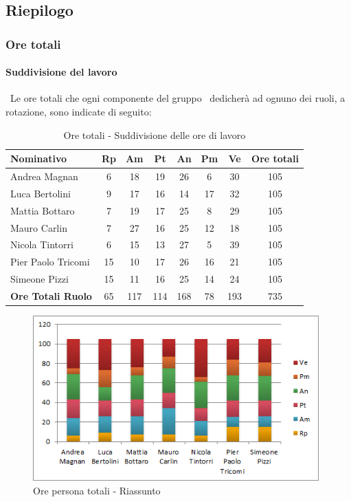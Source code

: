 \documentclass[../PianoDiProgetto.tex]{subfiles}
\begin{document}
\vspace{35mm}	
	
	\subsection{Riepilogo}
			\subsubsection{Ore totali}
				\paragraph{Suddivisione del lavoro}\
					Le ore totali che ogni componente del gruppo \GRUPPO\ dedicherà ad ognuno dei ruoli, a rotazione, sono indicate di seguito:
	
	\begin{table}[H]
		\begin{tabularx}{\textwidth}{l  * {6}{c}  c}
			\toprule
			\textbf{Nominativo} & \textbf{Rp} & \textbf{Am} & \textbf{Pt} 
						& \textbf{An} & \textbf{Pm} & \textbf{Ve} & \textbf{Ore totali} \\
			\midrule
			Andrea Magnan  & 6  & 18 & 19 & 26 & 6  & 30 & 105 \\
			Luca Bertolini  & 9 & 17 & 16 & 14 & 17 & 32 & 105 \\
			Mattia Bottaro  & 7  & 19 & 17 & 25 & 8  & 29 & 105 \\
			Mauro Carlin  & 7 & 27 & 16 & 25 & 12 & 18 & 105 \\
			Nicola Tintorri  & 6 & 15 & 13 & 27 & 5 & 39 & 105 \\
			Pier Paolo Tricomi  & 15 & 10 & 17 & 26 & 16 & 21 & 105 \\
			Simeone Pizzi & 15 & 11 & 16 & 25 & 14 & 24 & 105 \\
			\midrule
			\textbf{Ore Totali Ruolo} & 65    & 117   & 114   & 168   & 78   & 193   & 735 \\
			\bottomrule
		\end{tabularx}
		\caption{Ore totali - Suddivisione delle ore di lavoro}
	\end{table}
	
\newpage
\vfill
		
	\begin{figure}[H]
		\centering
		\includegraphics[width=11cm, trim=1cm 0cm 1cm 0cm]{grafici/TOT-persona}
			\caption{Ore persona totali - Riassunto}
	\end{figure}
	
\end{document}

